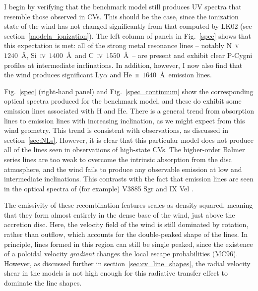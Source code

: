 I begin by verifying that the benchmark model still produces UV
spectra that resemble those observed in CVs. This should be
the case, since the ionization state of the wind has not changed
significantly from that computed by LK02 (see section~\ref{modela_ionization}). 
The left column of panels in Fig.~\ref{spec} shows that this expectation
is met: all of the strong metal resonance
lines -- notably N~\textsc{v}~$1240$~\AA,
Si~\textsc{iv}~$1400$~\AA\ and C~\textsc{iv}~$1550$~\AA\ -- 
are present and exhibit clear P-Cygni profiles
at intermediate inclinations. In addition, however, I now also find
that the wind produces significant Ly$\alpha$ and
He~\textsc{ii}~$1640$~\AA\ emission lines. 

Fig.~\ref{spec} (right-hand panel) and Fig.~\ref{spec_continuum}
show the corresponding optical spectra produced for
the benchmark model, and these do exhibit some emission lines
associated with H and He. There is 
a general trend from absorption lines to emission lines 
with increasing inclination, as we might expect from this wind
geometry. This trend is consistent with observations, as discussed in 
section~\ref{sec:NLs}. However, it is clear that this particular model
does not produce all of the lines seen in observations of high-state CVs.
The higher-order Balmer series lines are too weak
to overcome the intrinsic absorption from the disc atmosphere, and the wind 
fails to produce any observable emission at low and intermediate inclinations.
This contrasts with the fact that emission lines are seen 
in the optical spectra of (for example) V3885 Sgr \citep{hartley2005}
and IX Vel \citep[][see also Fig.~\ref{fig:NL_spec}]{beuermann1990}.

The emissivity of these recombination 
features scales as density squared, meaning that they form almost entirely in the 
dense base of the wind, just above the accretion disc. Here, the
velocity field of the wind is still dominated by rotation, rather than
outflow, which accounts for the double-peaked shape of the lines. In
principle, lines formed in this region can still be single peaked,
since the existence of a poloidal velocity {\em gradient} changes the
local escape probabilities (MC96). However, as
discussed further in section~\ref{sec:cv_line_shapes}, the 
radial velocity shear in the
models is not high enough for this radiative transfer effect
to dominate the line shapes.

